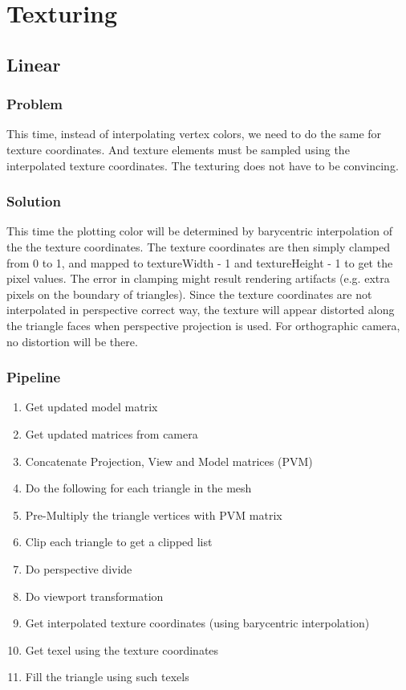\chapter{Texturing}
\section{Linear}
\subsection{Problem}
This time, instead of interpolating vertex colors, we need to do the same for texture coordinates. And texture elements must be sampled using the interpolated texture coordinates. The texturing does not have to be convincing.

\subsection{Solution}
This time the plotting color will be determined by barycentric interpolation of the the texture coordinates. The texture coordinates are then simply clamped from 0 to 1, and mapped to textureWidth - 1 and textureHeight - 1 to get the pixel values. The error in clamping might result rendering artifacts (e.g. extra pixels on the boundary of triangles). Since the texture coordinates are not interpolated in perspective correct way, the texture will appear distorted along the triangle faces when perspective projection is used. For orthographic camera, no distortion will be there.

\subsection{Pipeline}
\begin{enumerate}
    \item Get updated model matrix
    \item Get updated matrices from camera
    \item Concatenate Projection, View and Model matrices (PVM)
    \item Do the following for each triangle in the mesh
	\item Pre-Multiply the triangle vertices with PVM matrix
	\item Clip each triangle to get a clipped list
	\item Do perspective divide
	\item Do viewport transformation
	\item Get interpolated texture coordinates (using barycentric interpolation)
	\item Get texel using the texture coordinates
	\item Fill the triangle using such texels
\end{enumerate}

